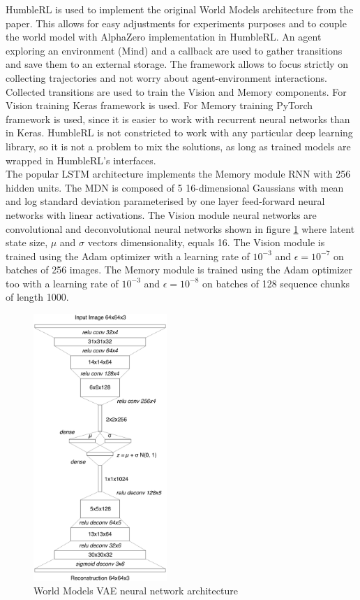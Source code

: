 HumbleRL is used to implement the original World Models architecture from the paper. This allows for easy adjustments for experiments purposes and to couple the world model with AlphaZero implementation in HumbleRL. An agent exploring an environment (Mind) and a callback are used to gather transitions and save them to an external storage. The framework allows to focus strictly on collecting trajectories and not worry about agent-environment interactions. \\
Collected transitions are used to train the Vision and Memory components. For Vision training Keras \cite{Code.Keras} framework is used. For Memory training PyTorch \cite{Code.PyTorch} framework is used, since it is easier to work with recurrent neural networks than in Keras. HumbleRL is not constricted to work with any particular deep learning library, so it is not a problem to mix the solutions, as long as trained models are wrapped in HumbleRL's interfaces. \\
The popular LSTM architecture \cite{Algo.LSTM} implements the Memory module RNN with 256 hidden units. The MDN is composed of 5 16-dimensional Gaussians with mean and log standard deviation parameterised by one layer feed-forward neural networks with linear activations. The Vision module neural networks are convolutional and deconvolutional neural networks shown in figure \ref{Fig.WorldModelsVAEArchitecture} where latent state size, $\mu$ and $\sigma$ vectors dimensionality, equals 16.
The Vision module is trained using the Adam optimizer \cite{Algo.Adam} with a learning rate of $10^{-3}$ and $\epsilon = 10^{−7}$ on batches of 256 images. The Memory module is trained using the Adam optimizer \cite{Algo.Adam} too with a learning rate of $10^{-3}$ and $\epsilon = 10^{−8}$ on batches of 128 sequence chunks of length 1000.

\begin{figure}[H]
\includegraphics[width=0.45\textwidth,keepaspectratio]{figures/WorldModels/world_models_vae_architecture.png}
\caption{World Models VAE neural network architecture \cite{Algo.WorldModels}}
\label{Fig.WorldModelsVAEArchitecture}
\end{figure}

